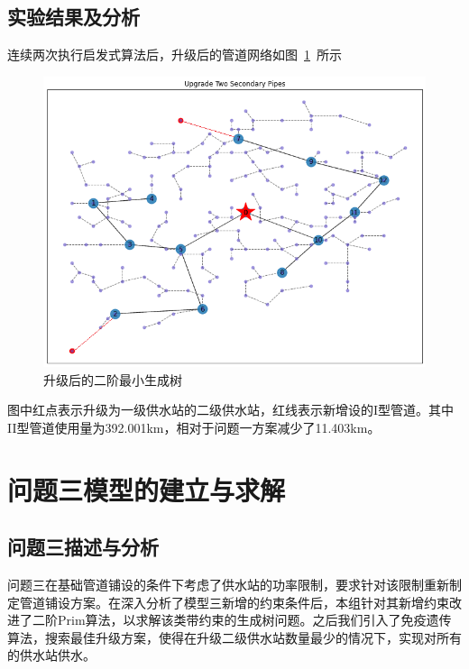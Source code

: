 \documentclass{whutmod}
\begin{document}
        \subsection{实验结果及分析}
        连续两次执行启发式算法后，升级后的管道网络如图~\ref{vwrsshbu}~所示
		  \begin{figure}[H]
			\centering
			\includegraphics[width=\textwidth]{figures/333.png}
			\caption{升级后的二阶最小生成树}\label{vwrsshbu}
		\end{figure}
        图中红点表示升级为一级供水站的二级供水站，红线表示新增设的I型管道。其中II型管道使用量为392.001km，相对于问题一方案减少了11.403km。
	

    \section{问题三模型的建立与求解}
   		\subsection{问题三描述与分析}
   		问题三在基础管道铺设的条件下考虑了供水站的功率限制，要求针对该限制重新制定管道铺设方案。在深入分析了模型三新增的约束条件后，本组针对其新增约束改进了二阶Prim算法，以求解该类带约束的生成树问题。之后我们引入了免疫遗传算法，搜索最佳升级方案，使得在升级二级供水站数量最少的情况下，实现对所有的供水站供水。
\end{document}

